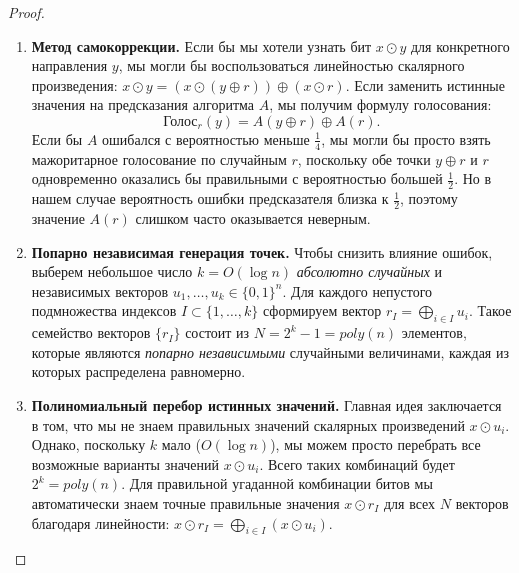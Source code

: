 \begin{proof}
\begin{enumerate}
        \item \textbf{Метод самокоррекции.} Если бы мы хотели узнать бит $x \odot y$ для конкретного направления $y$, мы могли бы воспользоваться линейностью скалярного произведения: $x \odot y = (x \odot (y \oplus r)) \oplus (x \odot r)$. Если заменить истинные значения на предсказания алгоритма $A$, мы получим формулу голосования:
        \[ \text{Голос}_r(y) = A(y \oplus r) \oplus A(r). \]
        Если бы $A$ ошибался с вероятностью меньше $\frac{1}{4}$, мы могли бы просто взять мажоритарное голосование по случайным $r$, поскольку обе точки $y \oplus r$ и $r$ одновременно оказались бы правильными с вероятностью большей $\frac{1}{2}$. Но в нашем случае вероятность ошибки предсказателя близка к $\frac{1}{2}$, поэтому значение $A(r)$ слишком часто оказывается неверным.

        \item \textbf{Попарно независимая генерация точек.} Чтобы снизить влияние ошибок, выберем небольшое число $k = O(\log n)$ \textit{абсолютно случайных} и независимых векторов $u_1, \dots, u_k \in \{0,1\}^n$. Для каждого непустого подмножества индексов $I \subset \{1, \dots, k\}$ сформируем вектор $r_I = \bigoplus_{i \in I} u_i$. 
        Такое семейство векторов $\{r_I\}$ состоит из $N = 2^k - 1 = poly(n)$ элементов, которые являются \textit{попарно независимыми} случайными величинами, каждая из которых распределена равномерно.

        \item \textbf{Полиномиальный перебор истинных значений.} Главная идея заключается в том, что мы не знаем правильных значений скалярных произведений $x \odot u_i$. Однако, поскольку $k$ мало ($O(\log n)$), мы можем просто перебрать все возможные варианты значений $x \odot u_i$. Всего таких комбинаций будет $2^k = poly(n)$. Для правильной угаданной комбинации битов мы автоматически знаем точные правильные значения $x \odot r_I$ для всех $N$ векторов благодаря линейности: $x \odot r_I = \bigoplus_{i \in I} (x \odot u_i)$.
    \end{enumerate}


\end{proof}
